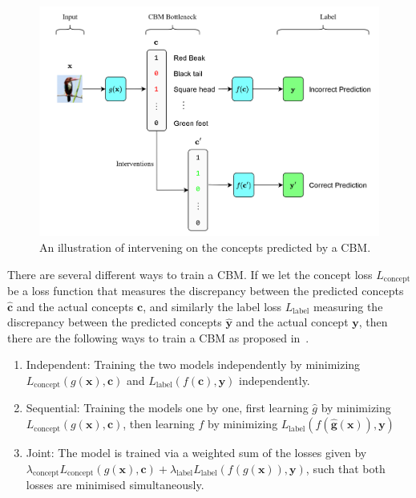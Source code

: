\documentclass[../main.tex]{subfiles}
\begin{document}
\begin{figure}[!h]
    \centering
    \includegraphics[width=\textwidth]{figs/background/cbm_interventions.png}
    \caption{An illustration of intervening on the concepts predicted by a CBM.}
    \label{fig:cbm-interventions}
\end{figure}


There are several different ways to train a CBM. 
If we let the concept loss $L_{\text{concept}}$ be a loss
 function that measures
the discrepancy between the predicted concepts $\hat{\mathbf{c}}$
and the actual concepts $\mathbf{c}$, and similarly the 
label loss $L_{\text{label}}$ measuring the discrepancy
between the predicted concepts $\hat{\mathbf{y}}$
and the actual concept $\mathbf{y}$, then there are the following ways
to train a CBM as proposed in~\cite{cbm}.

\begin{enumerate}
    \item Independent: Training the two models independently by minimizing
    $L_{\text{concept}}(g(\mathbf{x}), \mathbf{c})$ and $L_{\text{label}}(f(\mathbf{c}), \mathbf{y})$ independently.
    \item Sequential: Training the models one by one, first learning
    $\hat{g}$ by minimizing $L_{\text{concept}}(g(\mathbf{x}), \mathbf{c})$,
    then learning $f$ by minimizing $L_{\text{label}}(f(\mathbf{\hat{g}(\mathbf{x})}), \mathbf{y})$
    \item Joint: The model is trained via a weighted sum of the losses given by 
    $\lambda_{\text{concept}} L_{\text{concept}}(g(\mathbf{x}), \mathbf{c}) + \lambda_{\text{label}} L_{\text{label}}(f(g(\mathbf{x})), \mathbf{y})$,
    such that both losses are minimised simultaneously.
\end{enumerate}
\end{document}
